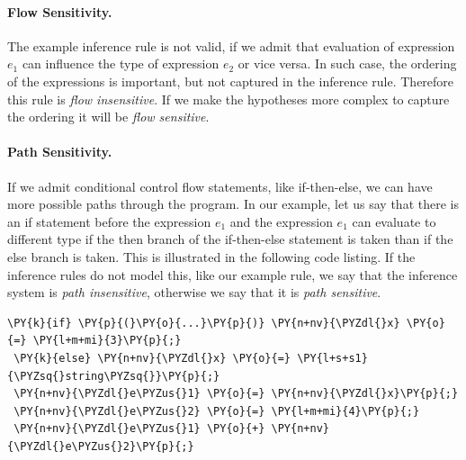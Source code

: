        \paragraph{Flow Sensitivity.}
        The example inference rule is not valid, if we admit that evaluation of 
        expression $e_1$ can influence the type of expression $e_2$ or vice versa. 
        In such case, the ordering of the expressions is important, but not captured 
        in the inference rule. Therefore this rule is \emph{flow insensitive}. If we make 
        the hypotheses more complex to capture the ordering 
        it will be \emph{flow sensitive}.
        
        \paragraph{Path Sensitivity.}
        If we admit conditional control flow statements, like if-then-else, 
        we can have more possible paths through the program. In our example, 
        let us say that there is an if statement before the expression $e_1$
        and the expression $e_1$ can evaluate to different 
        type if the then branch of the if-then-else statement is taken than 
        if the else branch is taken. This is illustrated in the following code listing. 
        If the inference rules do not model this, like our example rule, 
        we say that the inference system is 
        \emph{path insensitive}, otherwise we say 
        that it is \emph{path sensitive}.
        
\begin{Verbatim}[commandchars=\\\{\}]
 \PY{k}{if} \PY{p}{(}\PY{o}{...}\PY{p}{)} \PY{n+nv}{\PYZdl{}x} \PY{o}{=} \PY{l+m+mi}{3}\PY{p}{;}
 \PY{k}{else} \PY{n+nv}{\PYZdl{}x} \PY{o}{=} \PY{l+s+s1}{\PYZsq{}string\PYZsq{}}\PY{p}{;}
 \PY{n+nv}{\PYZdl{}e\PYZus{}1} \PY{o}{=} \PY{n+nv}{\PYZdl{}x}\PY{p}{;}
 \PY{n+nv}{\PYZdl{}e\PYZus{}2} \PY{o}{=} \PY{l+m+mi}{4}\PY{p}{;}
 \PY{n+nv}{\PYZdl{}e\PYZus{}1} \PY{o}{+} \PY{n+nv}{\PYZdl{}e\PYZus{}2}\PY{p}{;}
\end{Verbatim}
        
